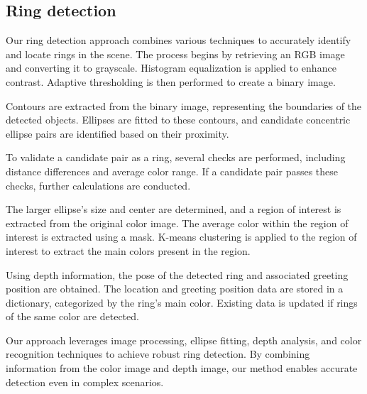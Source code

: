 \documentclass{article}
\begin{document}
\subsection{Ring detection}

Our ring detection approach combines various techniques to accurately identify and locate rings in the scene. The process begins by retrieving an RGB image and converting it to grayscale. Histogram equalization is applied to enhance contrast. Adaptive thresholding is then performed to create a binary image.

Contours are extracted from the binary image, representing the boundaries of the detected objects. Ellipses are fitted to these contours, and candidate concentric ellipse pairs are identified based on their proximity.

To validate a candidate pair as a ring, several checks are performed, including distance differences and average color range. If a candidate pair passes these checks, further calculations are conducted.

The larger ellipse's size and center are determined, and a region of interest is extracted from the original color image. The average color within the region of interest is extracted using a mask. K-means clustering is applied to the region of interest to extract the main colors present in the region.

Using depth information, the pose of the detected ring and associated greeting position are obtained. The location and greeting position data are stored in a dictionary, categorized by the ring's main color. Existing data is updated if rings of the same color are detected.

Our approach leverages image processing, ellipse fitting, depth analysis, and color recognition techniques to achieve robust ring detection. By combining information from the color image and depth image, our method enables accurate detection even in complex scenarios.
\end{document}
